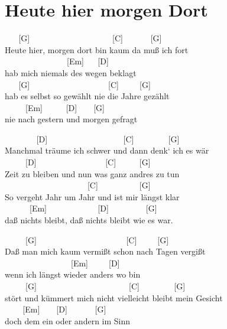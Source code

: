 \documentclass[
  letterpaper,
]{scrbook}
\begin{document}
\hypertarget{heute-hier-morgen-dort}{%
\chapter{Heute hier morgen Dort}\label{heute-hier-morgen-dort}}

~ ~ {[}G{]} ~ ~ ~ ~ ~ ~ ~ ~ ~ ~ ~ ~{[}C{]} ~ ~ ~ ~{[}G{]}\\
Heute hier, morgen dort bin kaum da muß ich fort\\
\hspace*{0.333em} ~ ~ ~ ~ ~ ~ ~ ~ ~ {[}Em{]} ~ ~{[}D{]}\\
hab mich niemals des wegen beklagt\\
\hspace*{0.333em} ~ ~ {[}G{]} ~ ~ ~ ~ ~ ~ ~ ~ ~ ~ ~ {[}C{]} ~ ~
~{[}G{]}\\
hab es selbst so gewählt nie die Jahre gezählt\\
\hspace*{0.333em} ~ ~ ~ {[}Em{]} ~ ~ ~ {[}D{]} ~ ~ {[}G{]}\\
nie nach gestern und morgen gefragt

~ ~ ~ ~ ~{[}D{]} ~ ~ ~ ~ ~ ~ ~ ~ ~ ~ ~{[}C{]} ~ ~ ~ ~ ~{[}G{]}\\
Manchmal träume ich schwer und dann denk` ich es wär\\
\hspace*{0.333em} ~ ~ ~ {[}D{]} ~ ~ ~ ~ ~ ~ ~ ~ ~ ~{[}C{]} ~ ~ ~
{[}G{]}\\
Zeit zu bleiben und nun was ganz andres zu tun\\
\hspace*{0.333em} ~ ~ ~ ~ ~ ~ ~ ~ ~ ~ ~ ~ {[}C{]} ~ ~ ~ ~ ~ ~{[}G{]}\\
So vergeht Jahr um Jahr und ist mir längst klar\\
\hspace*{0.333em} ~ ~ ~ ~{[}Em{]} ~ ~ ~ ~ ~ ~ ~ {[}D{]} ~ ~ ~ ~ ~
{[}G{]}\\
daß nichts bleibt, daß nichts bleibt wie es war.

~ ~ ~ {[}G{]} ~ ~ ~ ~ ~ ~ ~ ~ ~ ~ ~ ~ ~{[}C{]} ~ ~ ~{[}G{]}\\
Daß man mich kaum vermißt schon nach Tagen vergißt\\
\hspace*{0.333em} ~ ~ ~ ~ ~ ~ ~ ~ ~ ~{[}Em{]} ~ ~ ~{[}D{]}\\
wenn ich längst wieder anders wo bin\\
\hspace*{0.333em} ~ ~ ~ {[}G{]} ~ ~ ~ ~ ~ ~ ~ ~ ~ ~ ~ ~ ~ {[}C{]} ~ ~ ~
~ ~{[}G{]}\\
stört und kümmert mich nicht vielleicht bleibt mein Gesicht\\
\hspace*{0.333em} ~ ~ ~{[}Em{]} ~ ~ {[}D{]} ~ ~ ~ ~{[}G{]}\\
doch dem ein oder andern im Sinn
\end{document}
